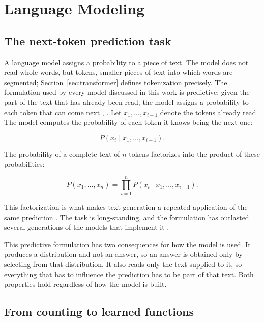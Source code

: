 \section{Language Modeling}
\label{sec:language-modeling}

\subsection{The next-token prediction task}
\label{subsec:next-token}

A language model assigns a probability to a piece of text. The model does not read whole words, but tokens, smaller pieces of text into which words are segmented; Section~\ref{sec:transformer} defines tokenization precisely. The formulation used by every model discussed in this work is predictive: given the part of the text that has already been read, the model assigns a probability to each token that can come next \cite[Chap.~24]{russellArtificialIntelligenceModern2022}, \cite{zhaoSurveyLargeLanguage2026}. Let $x_1, \dots, x_{i-1}$ denote the tokens already read. The model computes the probability of each token it knows being the next one:

\begin{equation}
    P(x_i \mid x_1, \dots, x_{i-1}).
\end{equation}

The probability of a complete text of $n$ tokens factorizes into the product of these probabilities:

\begin{equation}
    \label{eq:factorization}
    P(x_1, \dots, x_n) = \prod_{i=1}^{n} P(x_i \mid x_1, \dots, x_{i-1}).
\end{equation}

This factorization is what makes text generation a repeated application of the same prediction \cite[Chap.~24]{russellArtificialIntelligenceModern2022}. The task is long-standing, and the formulation has outlasted several generations of the models that implement it \cite{zhaoSurveyLargeLanguage2026}.

This predictive formulation has two consequences for how the model is used. It produces a distribution and not an answer, so an answer is obtained only by selecting from that distribution. It also reads only the text supplied to it, so everything that has to influence the prediction has to be part of that text. Both properties hold regardless of how the model is built.

\subsection{From counting to learned functions}
\label{subsec:counting-to-learned}


